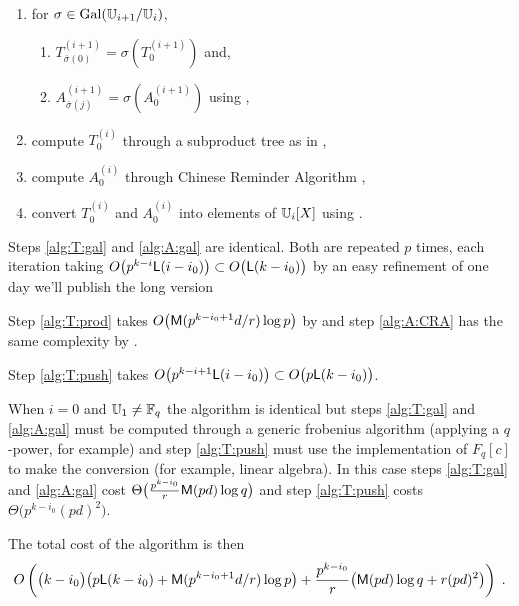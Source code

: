 \begin{enumerate}
\item for $\sigma \in \operatorname{Gal}(\mathbb{U}_{i+1}/\mathbb{U}_i)$,
  \begin{enumerate}
  \item\label{alg:T:gal} $T_{\bar\sigma(0)}^{(i+1)} =
    \sigma\left(T_0^{(i+1)}\right)$ and,
  \item\label{alg:A:gal} $A_{\bar\sigma(j)}^{(i+1)} =
    \sigma\left(A_0^{(i+1)}\right)$ using
    \cite[]{DFS09},
  \end{enumerate}
\item\label{alg:T:prod} compute $T_0^{(i)}$ through a subproduct tree
  as in \cite[Algo. 10.3]{vzGG},
\item\label{alg:A:CRA} compute $A_0^{(i)}$ through Chinese Reminder
  Algorithm \cite[Algo. 10.16]{vzGG},
\item\label{alg:T:push} convert $T_0^{(i)}$ and $A_0^{(i)}$ into
  elements of $\mathbb{U}_i[X]$ using \cite[]{DFS09}.
\end{enumerate}

Steps \ref{alg:T:gal} and \ref{alg:A:gal} are identical. Both are
repeated $p$ times, each iteration taking $O\bigl(p^{k-i}{\sf
  L}(i-i_0)\bigr) \subset O\bigl({\sf L}(k-i_0)\bigr)$ by an easy
refinement of \cite[Th. 11]{DFS09} \todo one day we'll publish the
long version \todo

Step \ref{alg:T:prod} takes $O\bigl(\mathrm{\sf M}(p^{k-i_0+1}d/r)\log p\bigr)$
by \cite[Lemma 10.4]{vzGG} and step \ref{alg:A:CRA} has the same
complexity by \cite[Coro. 10.17]{vzGG}.

Step \ref{alg:T:push} takes $O\bigl(p^{k-i+1}{\sf L}(i-i_0)\bigr)
\subset O\bigl(p{\sf L}(k-i_0)\bigr)$.

When $i=0$ and $\mathbb{U}_1\ne\mathbb{F}_q$ the algorithm is identical but steps
\ref{alg:T:gal} and \ref{alg:A:gal} must be computed through a generic
frobenius algorithm (applying a $q$-power, for example) and step
\ref{alg:T:push} must use the implementation of $F_q[c]$ to make the
conversion (for example, linear algebra). In this case steps
\ref{alg:T:gal} and \ref{alg:A:gal} cost
$\Theta\bigl(\frac{p^{k-i_0}}{r}\mathrm{\sf M}(pd)\log q \bigr)$ and step
\ref{alg:T:push} costs $\Theta\bigl(p^{k-i_0}(pd)^2\bigr)$.

The total cost of the algorithm is then
\begin{equation*}
  \label{eq:T:complexity}
  O\left(\bigl(k-i_0\bigr)\bigl(p{\sf L}(k-i_0) + \mathrm{\sf M}(p^{k-i_0+1}d/r)\log p\bigr) +
    \frac{p^{k-i_0}}{r}\bigl(\mathrm{\sf M}(pd)\log q + r(pd)^2\bigr) \right)
  \;\text{.}
\end{equation*}

